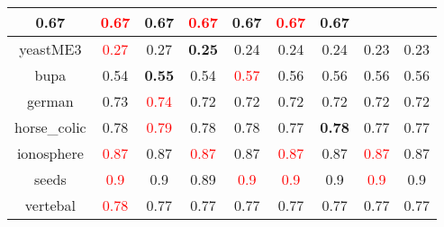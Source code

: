 \documentclass{article}%
\begin{document}
\begin{tabular}{c|cccccccc}
{0.67
}&\textcolor{red}{ 
0.67
}&0.67&\textcolor{red}{ 
0.67
}&0.67&\textcolor{red}{ 
0.67
}&0.67\\%
\hline%
yeastME3&\textcolor{red}{ 
0.27
}&0.27&\textbf{0.25}&0.24&0.24&0.24&0.23&0.23\\%
\hline%
bupa&0.54&\textbf{0.55}&0.54&\textcolor{red}{ 
0.57
}&0.56&0.56&0.56&0.56\\%
\hline%
german&0.73&\textcolor{red}{ 
0.74
}&0.72&0.72&0.72&0.72&0.72&0.72\\%
\hline%
horse\_colic&0.78&\textcolor{red}{ 
0.79
}&0.78&0.78&0.77&\textbf{0.78}&0.77&0.77\\%
\hline%
ionosphere&\textcolor{red}{ 
0.87
}&0.87&\textcolor{red}{ 
0.87
}&0.87&\textcolor{red}{ 
0.87
}&0.87&\textcolor{red}{ 
0.87
}&0.87\\%
\hline%
seeds&\textcolor{red}{ 
0.9
}&0.9&0.89&\textcolor{red}{ 
0.9
}&\textcolor{red}{ 
0.9
}&0.9&\textcolor{red}{ 
0.9
}&0.9\\%
\hline%
vertebal&\textcolor{red}{ 
0.78
}&0.77&0.77&0.77&0.77&0.77&0.77&0.77\\%
\hline%
\end{tabular}

%
\end{document}
